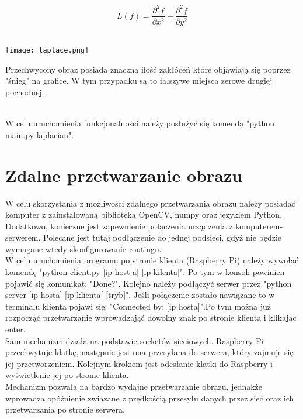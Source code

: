 \documentclass{article}
\begin{document}
$$ L(f) = \frac{\partial^2f}{\partial x^2} + \frac{\partial^2f}{\partial y^2} $$\\

\begin{center}
    \texttt{[image: laplace.png]}
\end{center}

Przechwycony obraz posiada znaczną ilość zakłóceń które objawiają się poprzez "śnieg" na grafice. W tym przypadku są to fałszywe miejsca zerowe drugiej pochodnej.


\\
W celu uruchomienia funkcjonalności należy posłużyć się komendą "python main.py laplacian".

\section{Zdalne przetwarzanie obrazu}
W celu skorzystania z możliwości zdalnego przetwarzania obrazu należy posiadać komputer z zainstalowaną biblioteką OpenCV, numpy oraz językiem Python. Dodatkowo, konieczne jest zapewnienie połączenia urządzenia z komputerem-serwerem. Polecane jest tutaj podłączenie do jednej podsieci, gdyż nie będzie wymagane wtedy skonfigurowanie routingu. \\

W celu uruchomienia programu po stronie klienta (Raspberry Pi) należy wywołać komendę "python client.py [ip host-a] [ip kilenta]". Po tym w konsoli powinien pojawić się komunikat: "Done?". Kolejno należy podłączyć serwer przez "python server [ip hosta] [ip klienta[ [tryb]". Jeśli połączenie zostało nawiązane to w terminalu klienta pojawi się: "Connected by: [ip hosta]".Po tym można już rozpocząć przetwarzanie wprowadzająć dowolny znak po stronie klienta i klikając enter. \\
Sam mechanizm działa na podstawie socketów sieciowych. Raspberry Pi przechwytuje klatkę, następnie jest ona przesyłana do serwera, który zajmuje się jej przetworzeniem. Kolejnym krokiem jest odesłanie klatki do Raspberry i wyświetlenie jej po stronie klienta. \\
Mechanizm pozwala na bardzo wydajne przetwarzanie obrazu, jednakże wprowadza opóźnienie związane z prędkością przesyłu danych przez sieć oraz ich przetwarzania po stronie serwera.
\end{document}
